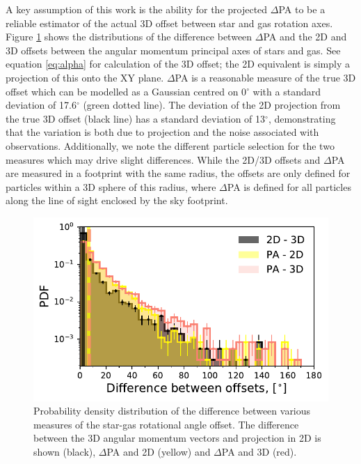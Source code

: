 A key assumption of this work is the ability for the projected $\Delta$PA to be a reliable estimator of the actual 3D offset between star and gas rotation axes. Figure \ref{fig:PA_residual} shows the distributions of the difference between $\Delta$PA and the 2D and 3D offsets between the angular momentum principal axes of stars and gas. See equation \ref{eq:alpha} for calculation of the 3D offset; the 2D equivalent is simply a projection of this onto the XY plane. $\Delta$PA is a reasonable measure of the true 3D offset which can be modelled as a Gaussian centred on 0$^{\circ}$ with a standard deviation of 17.6$^{\circ}$ (green dotted line). The deviation of the 2D projection from the true 3D offset (black line) has a standard deviation of 13$^{\circ}$, demonstrating that the variation is both due to projection and the noise associated with observations. Additionally, we note the different particle selection for the two measures which may drive slight differences. While the 2D/3D offsets and $\Delta$PA are measured in a footprint with the same radius, the offsets are only defined for particles within a 3D sphere of this radius, where $\Delta$PA is defined for all particles along the line of sight enclosed by the sky footprint. 

\begin{figure}
    \centering
	\includegraphics[width=0.7\linewidth]{misalignment_TNG/PA_alpha_resid_hist.pdf}
    \caption{Probability density distribution of the difference between various measures of the star-gas rotational angle offset. The difference between the 3D angular momentum vectors and projection in 2D is shown (black), $\Delta$PA and 2D (yellow) and $\Delta$PA and 3D (red).}
    \label{fig:PA_residual}
\end{figure}

